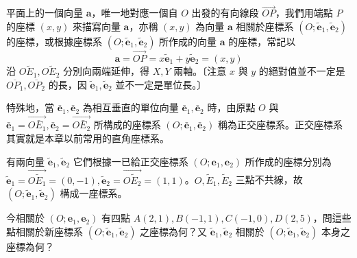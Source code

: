 平面上的一個向量 $\mathbf{a}$，唯一地對應一個自 $O$ 出發的有向線段 $\vec{OP}$，我們用端點 $P$ 的座標 $(x, y)$ 來描寫向量 $\mathbf{a}$，亦稱 $(x, y)$ 為向量 $\mathbf{a}$ 相關於座標系 $(O; \tilde{\mathbf{e}}_1, \tilde{\mathbf{e}}_2)$ 的座標，或根據座標系 $(O; \tilde{\mathbf{e}}_1, \tilde{\mathbf{e}}_2)$ 所作成的向量 $\mathbf{a}$ 的座標，常記以
\[ \mathbf{a} = \vec{OP} = x\tilde{\mathbf{e}}_1 + y\tilde{\mathbf{e}}_2 = (x, y) \]
沿 $O\tilde{E}_1, O\tilde{E}_2$ 分別向兩端延伸，得 $X, Y$ 兩軸。〔注意 $x$ 與 $y$ 的絕對值並不一定是 $\overline{OP_1}, \overline{OP_2}$ 的長，因 $\tilde{\mathbf{e}}_1, \tilde{\mathbf{e}}_2$ 並不一定是單位長。〕

特殊地，當 $\bar{\mathbf{e}}_1, \bar{\mathbf{e}}_2$ 為相互垂直的單位向量 $\bar{\mathbf{e}}_1, \bar{\mathbf{e}}_2$ 時，由原點 $O$ 與 $\bar{\mathbf{e}}_1 = \vec{O\bar{E}_1}, \bar{\mathbf{e}}_2 = \vec{O\bar{E}_2}$ 所構成的座標系 $(O; \bar{\mathbf{e}}_1, \bar{\mathbf{e}}_2)$ 稱為正交座標系。正交座標系其實就是本章以前常用的直角座標系。

\begin{example}[例 1]
有兩向量 $\tilde{\mathbf{e}}_1, \tilde{\mathbf{e}}_2$ 它們根據一已給正交座標系 $(O; \mathbf{e}_1, \mathbf{e}_2)$ 所作成的座標分別為 $\tilde{\mathbf{e}}_1 = \vec{O\tilde{E}_1} = (0, -1), \tilde{\mathbf{e}}_2 = \vec{O\tilde{E}_2} = (1, 1)$。$O, \tilde{E}_1, \tilde{E}_2$ 三點不共線，故 $(O; \tilde{\mathbf{e}}_1, \tilde{\mathbf{e}}_2)$ 構成一座標系。

今相關於 $(O; \mathbf{e}_1, \mathbf{e}_2)$ 有四點 $A(2, 1), B(-1, 1), C(-1, 0), D(2, 5)$，問這些點相關於新座標系 $(O; \tilde{\mathbf{e}}_1, \tilde{\mathbf{e}}_2)$ 之座標為何？又 $\tilde{\mathbf{e}}_1, \tilde{\mathbf{e}}_2$ 相關於 $(O; \tilde{\mathbf{e}}_1, \tilde{\mathbf{e}}_2)$ 本身之座標為何？
\end{example}

